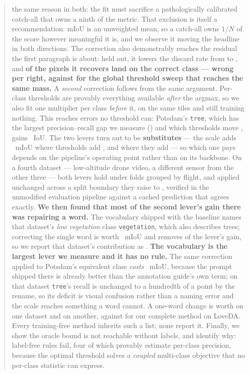 \documentclass[10pt,a4paper]{article}                        %
\newcommand{\best}[1]{\textbf{#1}}
\begin{document}
\begin{abstract}
the same reason in both: the fit must sacrifice a pathologically calibrated
catch-all that owns a ninth of the metric. That exclusion is itself a recommendation: mIoU is an
unweighted mean, so a catch-all owns $1/N$ of the score however meaningful it is,
and we observe it moving the headline in both directions.
The correction also demonstrably reaches the residual the first paragraph is about:
held out, it lowers the discard rate from \raDiscA{} to \raDiscC{}, and
\best{\raCorrect{} of the pixels it recovers land on the correct class ---
\raWPR{} wrong per right, against \tauRatio{} for the global threshold sweep that
reaches the same mass.}
A \emph{second} correction follows from the same argument. Per-class thresholds are
provably everything available \emph{after} the argmax, so we also fit one multiplier
per class \emph{before} it, on the same tiles and still training nothing. This
reaches errors no threshold can: Potsdam's \texttt{tree}, which has the largest
precision--recall gap we measure (\treeGap{}) and which thresholds move \treeTau{},
gains \treeScale{}~IoU. The two levers turn out to be \best{substitutes} --- the
scale adds \scPots{}~mIoU where thresholds add \subPotstau{}, and \scCI{} where they
add \subCItau{} --- so which one pays depends on the pipeline's operating point
rather than on its backbone.
On a fourth dataset --- low-altitude drone video, a different sensor from the other
three --- both levers hold under folds grouped by flight, and applied unchanged
across a split boundary they raise \uavBase{} to \uavEEtwo{}, verified in the
unmodified evaluation pipeline against a cached prediction that agrees exactly.
\best{We then found that most of the second lever's gain there was repairing a word.}
The vocabulary shipped with the baseline names that dataset's \emph{low vegetation}
class \texttt{vegetation}, which also describes trees; correcting the single word is
worth \vocUavGain{}~mIoU and removes \uavScaleLost{} of the lever's gain, so we
report that dataset's contribution as \uavCorrMethod{}. \best{The vocabulary is the
largest lever we measure and it has no rule.} The same correction applied to
Potsdam's equivalent class \emph{costs} \vocPotsGain{}~mIoU, because the prompt
shipped there is already better than the annotation guide's own term; on that dataset
\texttt{tree}'s recall is unchanged to a hundredth of a point by the rename, so its
deficit is visual confusion rather than a naming error and the scale reaches
something a word cannot. A one-word change is worth \vocUavGain{} on one dataset and
\vocLoveBarren{} on another, against \loveTotal{} for our complete method on LoveDA.
Every training-free method inherits such a list; none report it.
Finally, we show the oracle bound is not reachable without labels, and identify
why: \nAttempts{} label-free rules fail, four of which provably estimate per-class
precision, because the optimal threshold solves a \emph{coupled} multi-class
objective that no per-class statistic can express.
\end{abstract}
\end{document}
